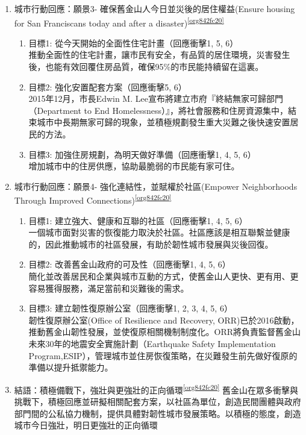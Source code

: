 \documentclass[a4paper,12pt]{article}
\begin{document}
\begin{enumerate}
\item 城市行動回應：願景3- 確保舊金山人今日並災後的居住權益(Ensure housing for San Franciscans today and after a disaster)\textsuperscript{\ref{org842fc20}}
\label{sec:org8d65109}
\begin{enumerate}
\item 目標1: 從今天開始的全面性住宅計畫（回應衝擊1, 5, 6）\\
推動全面性的住宅計畫，讓市民有安全，有品質的居住環境，災害發生後，也能有效回覆住房品質，確保95\%的市民能持續留在這裏。\\
\item 目標2: 強化安置配套方案（回應衝擊5, 6）\\
2015年12月，市長Edwin M. Lee宣布將建立市府『終結無家可歸部門（Department to End Homelessness）』，將社會服務和住房資源集中，結束城市中長期無家可歸的現象，並積極規劃發生重大災難之後快速安置居民的方法。\\
\item 目標3: 加強住房規劃，為明天做好準備（回應衝擊1, 4, 5, 6）\\
增加城市中的住房供應，協助最脆弱的市民能有家可住。\\
\end{enumerate}

\item 城市行動回應：願景4- 強化連結性，並賦權於社區(Empower Neighborhoods Through Improved Connections)\textsuperscript{\ref{org842fc20}}
\label{sec:org1a7dc85}
\begin{enumerate}
\item 目標1: 建立強大、健康和互聯的社區（回應衝擊1, 4, 5, 6）\\
一個城市面對災害的恢復能力取決於社區。社區應該是相互聯繫並健康的，因此推動城市的社區發展，有助於韌性城市發展與災後回復。\\
\item 目標2: 改善舊金山政府的可及性（回應衝擊1, 4, 5, 6）\\
簡化並改善居民和企業與城市互動的方式，使舊金山人更快、更有用、更容易獲得服務，滿足當前和災難後的需求。\\
\item 目標3: 建立韌性復原辦公室（回應衝擊1, 2, 3, 4, 5, 6）\\
韌性復原辦公室(Office of Resilience and Recovery, ORR)已於2016啟動，推動舊金山韌性發展，並使復原相關機制制度化。ORR將負責監督舊金山未來30年的地震安全實施計劃（Earthquake Safety Implementation Program,ESIP），管理城市並住房恢復策略，在災難發生前先做好復原的準備以提升抵禦能力。\\
\end{enumerate}

\item 結語：積極備戰下，強壯與更強壯的正向循環\textsuperscript{\ref{org842fc20}}
\label{sec:org5bf39bc}
舊金山在眾多衝擊與挑戰下，積極回應並研擬相關配套方案，以社區為單位，創造民間團體與政府部門間的公私協力機制，提供具體對韌性城市發展策略。以積極的態度，創造城市今日強壯，明日更強壯的正向循環\\
\end{enumerate}
\end{document}
